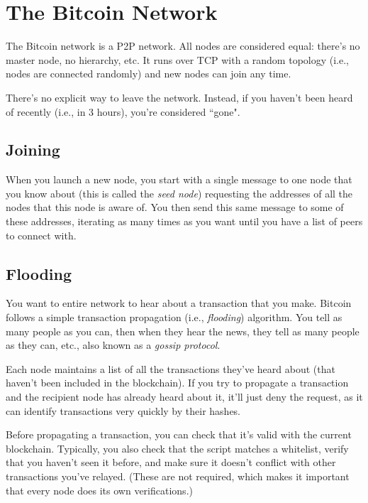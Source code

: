 \documentclass[12pt]{article}
\begin{document}
\section*{The Bitcoin Network}

The Bitcoin network is a P2P network. All nodes are considered equal: there's no master node, no hierarchy, etc. It runs over TCP with a random topology (i.e., nodes are connected randomly) and new nodes can join any time.

There's no explicit way to leave the network. Instead, if you haven't been heard of recently (i.e., in 3 hours), you're considered ``gone".

\subsection*{Joining}

When you launch a new node, you start with a single message to one node that you know about (this is called the \textit{seed node}) requesting the addresses of all the nodes that this node is aware of. You then send this same message to some of these addresses, iterating as many times as you want until you have a list of peers to connect with.

\subsection*{Flooding}

You want to entire network to hear about a transaction that you make. Bitcoin follows a simple transaction propagation (i.e., \textit{flooding}) algorithm. You tell as many people as you can, then when they hear the news, they tell as many people as they can, etc., also known as a \textit{gossip protocol}.

Each node maintains a list of all the transactions they've heard about (that haven't been included in the blockchain). If you try to propagate a transaction and the recipient node has already heard about it, it'll just deny the request, as it can identify transactions very quickly by their hashes.

Before propagating a transaction, you can check that it's valid with the current blockchain. Typically, you also check that the script matches a whitelist, verify that you haven't seen it before, and make sure it doesn't conflict with other transactions you've relayed. (These are not required, which makes it important that every node does its own verifications.)
\end{document}
